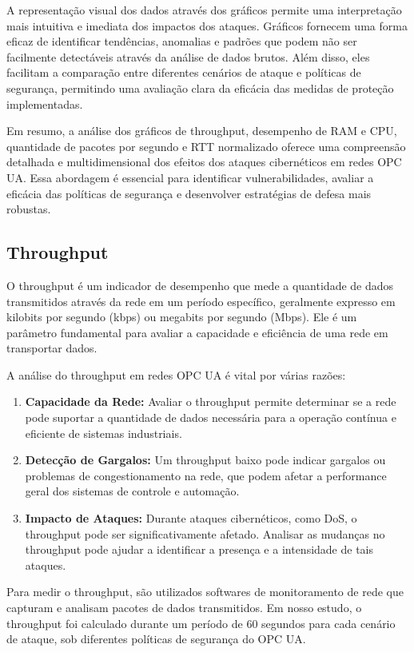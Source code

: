 {{    A representação visual dos dados através dos gráficos permite uma interpretação mais intuitiva e imediata dos impactos dos ataques. Gráficos fornecem uma forma eficaz de identificar tendências, anomalias e padrões que podem não ser facilmente detectáveis através da análise de dados brutos. Além disso, eles facilitam a comparação entre diferentes cenários de ataque e políticas de segurança, permitindo uma avaliação clara da eficácia das medidas de proteção implementadas.

    Em resumo, a análise dos gráficos de throughput, desempenho de RAM e CPU, quantidade de pacotes por segundo e RTT normalizado oferece uma compreensão detalhada e multidimensional dos efeitos dos ataques cibernéticos em redes OPC UA. Essa abordagem é essencial para identificar vulnerabilidades, avaliar a eficácia das políticas de segurança e desenvolver estratégias de defesa mais robustas.}

    \subsection{Throughput}

    O throughput é um indicador de desempenho que mede a quantidade de dados transmitidos através da rede em um período específico, geralmente expresso em kilobits por segundo (kbps) ou megabits por segundo (Mbps). Ele é um parâmetro fundamental para avaliar a capacidade e eficiência de uma rede em transportar dados.

    A análise do throughput em redes OPC UA é vital por várias razões:

    \begin{enumerate}
        \item \textbf{Capacidade da Rede:} Avaliar o throughput permite determinar se a rede pode suportar a quantidade de dados necessária para a operação contínua e eficiente de sistemas industriais.
        \item \textbf{Detecção de Gargalos:} Um throughput baixo pode indicar gargalos ou problemas de congestionamento na rede, que podem afetar a performance geral dos sistemas de controle e automação.
        \item \textbf{Impacto de Ataques:} Durante ataques cibernéticos, como DoS, o throughput pode ser significativamente afetado. Analisar as mudanças no throughput pode ajudar a identificar a presença e a intensidade de tais ataques.
    \end{enumerate}

    Para medir o throughput, são utilizados softwares de monitoramento de rede que capturam e analisam pacotes de dados transmitidos. Em nosso estudo, o throughput foi calculado durante um período de 60 segundos para cada cenário de ataque, sob diferentes políticas de segurança do OPC UA.

}
